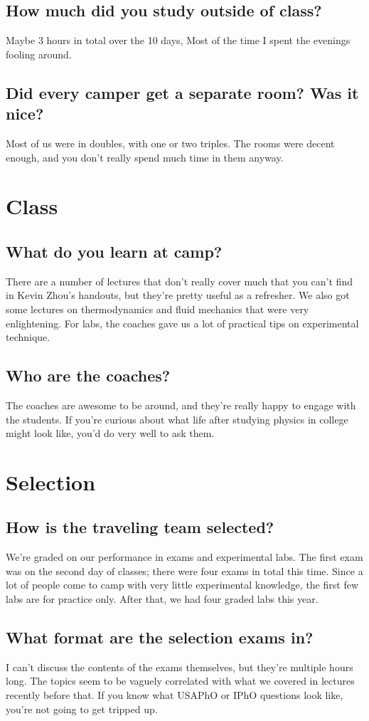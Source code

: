 \documentclass[11pt]{article}
\begin{document}
\subsection*{How much did you study outside of class?}
Maybe 3 hours in total over the 10 days, Most of the time I spent the evenings fooling around.
\subsection*{Did every camper get a separate room? Was it nice?}
Most of us were in doubles, with one or two triples. The rooms were decent enough, and you don’t really spend much time in them anyway.
\section*{Class}
\subsection*{What do you learn at camp?}
There are a number of lectures that don’t really cover much that you can’t find in Kevin Zhou’s handouts, but they’re pretty useful as a refresher. We also got some lectures on thermodynamics and fluid mechanics that were very enlightening. For labs, the coaches gave us a lot of practical tips on experimental technique. 
\subsection*{Who are the coaches?}
The coaches are awesome to be around, and they’re really happy to engage with the students. If you're curious about what life after studying physics in college might look like, you'd do very well to ask them.
\section*{Selection}
\subsection*{How is the traveling team selected?}
We’re graded on our performance in exams and experimental labs. The first exam was on the second day of classes; there were four exams in total this time. Since a lot of people come to camp with very little experimental knowledge, the first few labs are for practice only. After that, we had four graded labs this year.
\subsection*{What format are the selection exams in?}
I can’t discuss the contents of the exams themselves, but they’re multiple hours long. The topics seem to be vaguely correlated with what we covered in lectures recently before that. If you know what USAPhO or IPhO questions look like, you’re not going to get tripped up.
\end{document}
